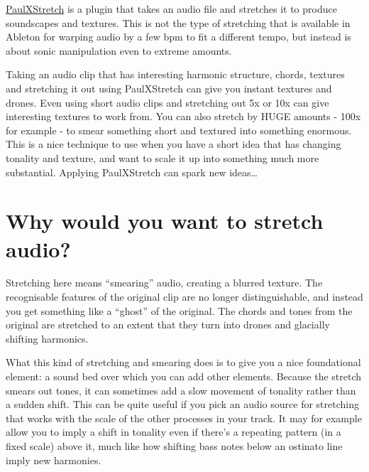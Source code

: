 \documentclass[
  12pt,
  letterpaper,
  oneside,
  open=any]{scrbook}
\begin{document}
\href{https://sonosaurus.com/paulxstretch/}{PaulXStretch} is a plugin
that takes an audio file and stretches it to produce soundscapes and
textures. This is not the type of stretching that is available in
Ableton for warping audio by a few bpm to fit a different tempo, but
instead is about sonic manipulation even to extreme amounts.

\begin{tcolorbox}[enhanced jigsaw, opacitybacktitle=0.6, rightrule=.15mm, leftrule=.75mm, opacityback=0, toptitle=1mm, toprule=.15mm, breakable, titlerule=0mm, colback=white, bottomtitle=1mm, title=\textcolor{quarto-callout-tip-color}{\faLightbulb}\hspace{0.5em}{Key idea}, coltitle=black, left=2mm, colframe=quarto-callout-tip-color-frame, bottomrule=.15mm, colbacktitle=quarto-callout-tip-color!10!white, arc=.35mm]

Taking an audio clip that has interesting harmonic structure, chords,
textures and stretching it out using PaulXStretch can give you instant
textures and drones. Even using short audio clips and stretching out 5x
or 10x can give interesting textures to work from. You can also stretch
by HUGE amounts - 100x for example - to smear something short and
textured into something enormous. This is a nice technique to use when
you have a short idea that has changing tonality and texture, and want
to scale it up into something much more substantial. Applying
PaulXStretch can spark new ideas\ldots{}

\end{tcolorbox}

\section{Why would you want to stretch
audio?}\label{why-would-you-want-to-stretch-audio}

Stretching here means ``smearing'' audio, creating a blurred texture.
The recognisable features of the original clip are no longer
distinguishable, and instead you get something like a ``ghost'' of the
original. The chords and tones from the original are stretched to an
extent that they turn into drones and glacially shifting harmonics.

What this kind of stretching and smearing does is to give you a nice
foundational element: a sound bed over which you can add other elements.
Because the stretch smears out tones, it can sometimes add a slow
movement of tonality rather than a sudden shift. This can be quite
useful if you pick an audio source for stretching that works with the
scale of the other processes in your track. It may for example allow you
to imply a shift in tonality even if there's a repeating pattern (in a
fixed scale) above it, much like how shifting bass notes below an
ostinato line imply new harmonies.
\end{document}
